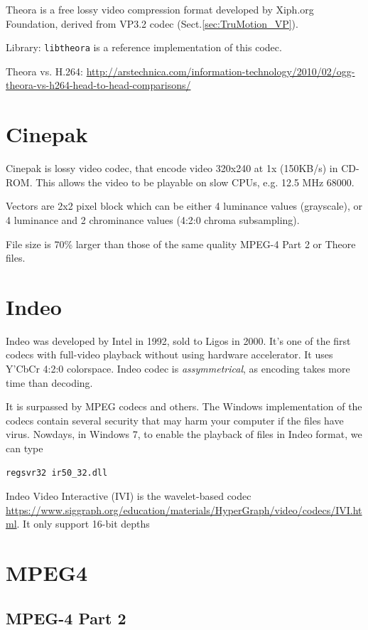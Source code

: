 Theora is a free lossy video compression format developed by Xiph.org
Foundation, derived from VP3.2 codec (Sect.\ref{sec:TruMotion_VP}). 

Library: \verb!libtheora! is a reference implementation of this codec.


Theora vs. H.264:
\url{http://arstechnica.com/information-technology/2010/02/ogg-theora-vs-h264-head-to-head-comparisons/}

\section{Cinepak}
\label{sec:Cinepak}

Cinepak is lossy video codec, that encode video 320x240 at 1x (150KB/s) in
CD-ROM. This allows the video to be playable on slow CPUs, e.g. 12.5 MHz 68000.

Vectors are 2x2 pixel block which can be either 4 luminance values (grayscale),
or 4 luminance and 2 chrominance values (4:2:0 chroma subsampling).

File size is 70\% larger than those of the same quality MPEG-4 Part 2 or Theore
files.

\section{Indeo}

Indeo was developed by Intel in 1992, sold to Ligos in 2000. It's one of the
first codecs with full-video playback without using hardware accelerator. It
uses Y'CbCr 4:2:0 colorspace. Indeo codec is {\it assymmetrical}, as encoding
takes more time than decoding.

It is surpassed by MPEG codecs and others. The Windows implementation of the
codecs contain several security that may harm your computer if the files have
virus. Nowdays, in Windows 7, to enable the
playback of files in Indeo format, we can type
\begin{verbatim}
regsvr32 ir50_32.dll
\end{verbatim}

Indeo Video Interactive (IVI) is the wavelet-based codec
\url{https://www.siggraph.org/education/materials/HyperGraph/video/codecs/IVI.html}.
It only support 16-bit depths

\section{MPEG4}

\subsection{MPEG-4 Part 2}
\label{sec:MPEG4-Part2}

